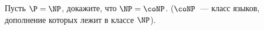 Пусть $\P = \NP$, докажите, что $\NP = \coNP$. ($\coNP$~--- класс языков, дополнение которых лежит в классе $\NP$).